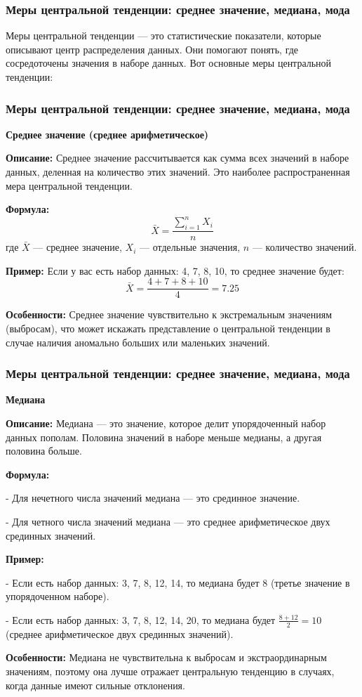 \documentclass[aspectratio=169]{beamer}
\begin{document}
\begin{frame}
\frametitle{Меры центральной тенденции: среднее значение, медиана, мода}
Меры центральной тенденции — это статистические показатели, которые описывают центр распределения данных. Они помогают понять, где сосредоточены значения в наборе данных. Вот основные меры центральной тенденции:
\end{frame}

\begin{frame}
\frametitle{Меры центральной тенденции: среднее значение, медиана, мода}
\textbf{Среднее значение (среднее арифметическое)}

\textbf{Описание:} Среднее значение рассчитывается как сумма всех значений в наборе данных, деленная на количество этих значений. Это наиболее распространенная мера центральной тенденции.

\textbf{Формула:}
  \[
  \bar{X} = \frac{\sum\limits_{i=1}^{n} X_i}{n}
  \]
где \(\bar{X}\) — среднее значение, \(X_i\) — отдельные значения, \(n\) — количество значений.

\textbf{Пример:} Если у вас есть набор данных: 4, 7, 8, 10, то среднее значение будет:
  \[
  \bar{X} = \frac{4 + 7 + 8 + 10}{4} = 7.25
  \]

\textbf{Особенности:} Среднее значение чувствительно к экстремальным значениям (выбросам), что может искажать представление о центральной тенденции в случае наличия аномально больших или маленьких значений.
\end{frame}

\begin{frame}
\frametitle{Меры центральной тенденции: среднее значение, медиана, мода}
\textbf{Медиана}

\textbf{Описание:} Медиана — это значение, которое делит упорядоченный набор данных пополам. Половина значений в наборе меньше медианы, а другая половина больше.

\textbf{Формула:}

\quad- Для нечетного числа значений медиана — это срединное значение.

\quad- Для четного числа значений медиана — это среднее арифметическое двух срединных значений.

\textbf{Пример:}

\quad- Если есть набор данных: 3, 7, 8, 12, 14, то медиана будет 8 (третье значение в упорядоченном наборе).

\quad- Если есть набор данных: 3, 7, 8, 12, 14, 20, то медиана будет \(\frac{8 + 12}{2} = 10\) (среднее арифметическое двух срединных значений).

\textbf{Особенности:} Медиана не чувствительна к выбросам и экстраординарным значениям, поэтому она лучше отражает центральную тенденцию в случаях, когда данные имеют сильные отклонения.
\end{frame}
\end{document}
